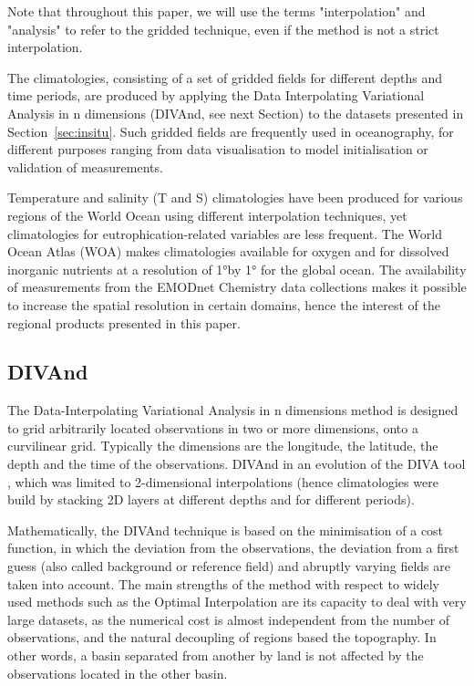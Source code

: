 \documentclass[essd, manuscript]{copernicus}
\begin{document}
Note that throughout this paper, we will use the terms "interpolation" and "analysis" to refer to the gridded technique, even if the method is not a strict interpolation.

The climatologies, consisting of a set of gridded fields for different depths and time periods, are produced by applying the Data Interpolating Variational Analysis in n dimensions (DIVAnd, see next Section) to the datasets presented in Section~\ref{sec:insitu}. Such gridded fields are frequently used in oceanography, for different purposes ranging from data visualisation to model initialisation or validation of measurements.  

Temperature and salinity (T and S) climatologies have been produced for various regions of the World Ocean using different interpolation techniques, yet climatologies for eutrophication-related variables are less frequent. The World Ocean Atlas (WOA) makes climatologies available for oxygen \citep[Dissolved Oxygen, Apparent Oxygen Utilization, and Oxygen Saturation,][]{Garcia2024} and for dissolved inorganic nutrients \citep[phosphate, nitrate and nitrate + nitrite, silicate,][]{Garcia2024b} at a resolution of 1°by 1° for the global ocean. The availability of measurements from the EMODnet Chemistry data collections makes it possible to increase the spatial resolution in certain domains, hence the interest of the regional products presented in this paper.


\subsection{DIVAnd\label{sec:divandmethod}}

The Data-Interpolating Variational Analysis in n dimensions method \citep[DIVAnd][]{BARTH2014} is designed to grid arbitrarily located observations in two or more dimensions, onto a curvilinear grid. Typically the dimensions are the longitude, the latitude, the depth and the time of the observations. DIVAnd in an evolution of the DIVA tool \citep{TROUPIN2012,BECKERS2014}, which was limited to 2-dimensional interpolations (hence climatologies were build by stacking 2D layers at different depths and for different periods). 

Mathematically, the DIVAnd technique is based on the minimisation of a cost function, in which the deviation from the observations, the deviation from a first guess (also called background or reference field) and abruptly varying fields are taken into account. The main strengths of the method with respect to widely used methods such as the Optimal Interpolation \citep[OI,][]{GANDIN1966,BRETHERTON1976} are its capacity to deal with very large datasets, as the numerical cost is almost independent from the number of observations, and the natural decoupling of regions based the topography. In other words, a basin separated from another by land is not affected by the observations located in the other basin.
\end{document}
